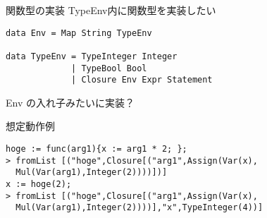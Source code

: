 \documentclass[uplatex,dvipdfmx,ja=standard]{beamer}
\begin{document}
\begin{frame}[fragile]{関数型の実装}
    TypeEnv内に関数型を実装したい
    \begin{verbatim}
data Env = Map String TypeEnv

data TypeEnv = TypeInteger Integer
             | TypeBool Bool
             | Closure Env Expr Statement
    \end{verbatim}
    Env の入れ子みたいに実装？

\end{frame}

\begin{frame}[fragile]{想定動作例}
    \begin{verbatim}
hoge := func(arg1){x := arg1 * 2; };
> fromList [("hoge",Closure[("arg1",Assign(Var(x),
  Mul(Var(arg1),Integer(2))))])]
x := hoge(2);
> fromList [("hoge",Closure[("arg1",Assign(Var(x),
  Mul(Var(arg1),Integer(2))))],"x",TypeInteger(4))]
    \end{verbatim}
\end{frame}

%
\end{document}
